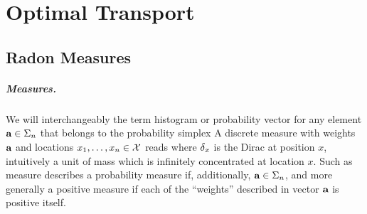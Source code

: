
\chapter{Optimal Transport}



\section{Radon Measures}

\newcommand{\dims}{d}

\paragraph{Measures.}

We will interchangeably the term histogram or probability vector for any element $\mathrm{\textbf{\upshape a}} \in \Sigma_n$ that belongs to the probability simplex
A discrete measure with weights $\mathrm{\textbf{\upshape a}}$ and locations $x_1,\dots,x_n\in\mathcal{X}$ reads
where $\delta_x$ is the Dirac at position $x$, intuitively a unit of mass which is infinitely concentrated at location $x$. Such as measure describes a probability measure if, additionally, $\mathrm{\textbf{\upshape a}}\in\Sigma_n$, and more generally a positive measure if each of the ``weights'' described in vector $\mathrm{\textbf{\upshape a}}$ is positive itself. 


